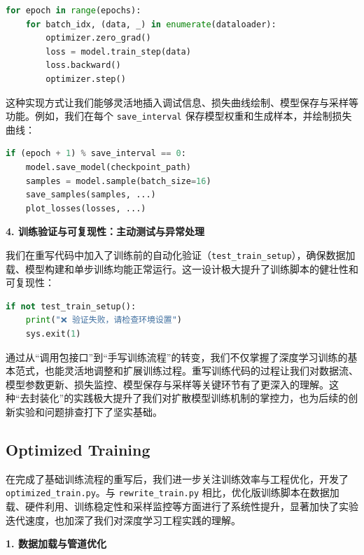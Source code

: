 \documentclass{ctexart}
\begin{document}
\begin{lstlisting}[language=python]
for epoch in range(epochs):
    for batch_idx, (data, _) in enumerate(dataloader):
        optimizer.zero_grad()
        loss = model.train_step(data)
        loss.backward()
        optimizer.step()
\end{lstlisting}

这种实现方式让我们能够灵活地插入调试信息、损失曲线绘制、模型保存与采样等功能。例如，我们在每个 \texttt{save\_interval} 保存模型权重和生成样本，并绘制损失曲线：

\begin{lstlisting}[language=python]
if (epoch + 1) % save_interval == 0:
    model.save_model(checkpoint_path)
    samples = model.sample(batch_size=16)
    save_samples(samples, ...)
    plot_losses(losses, ...)
\end{lstlisting}

\vspace{0.5em}
\noindent
\textbf{4. 训练验证与可复现性：主动测试与异常处理}

我们在重写代码中加入了训练前的自动化验证（\texttt{test\_train\_setup}），确保数据加载、模型构建和单步训练均能正常运行。这一设计极大提升了训练脚本的健壮性和可复现性：

\begin{lstlisting}[language=python]
if not test_train_setup():
    print("❌ 验证失败，请检查环境设置")
    sys.exit(1)
\end{lstlisting}

\vspace{0.5em}
\noindent

通过从“调用包接口”到“手写训练流程”的转变，我们不仅掌握了深度学习训练的基本范式，也能灵活地调整和扩展训练过程。重写训练代码的过程让我们对数据流、模型参数更新、损失监控、模型保存与采样等关键环节有了更深入的理解。这种“去封装化”的实践极大提升了我们对扩散模型训练机制的掌控力，也为后续的创新实验和问题排查打下了坚实基础。


\subsection{Optimized Training}
\noindent
在完成了基础训练流程的重写后，我们进一步关注训练效率与工程优化，开发了 \texttt{optimized\_train.py}。与 \texttt{rewrite\_train.py} 相比，优化版训练脚本在数据加载、硬件利用、训练稳定性和采样监控等方面进行了系统性提升，显著加快了实验迭代速度，也加深了我们对深度学习工程实践的理解。

\vspace{0.5em}
\noindent
\textbf{1. 数据加载与管道优化}
\end{document}
